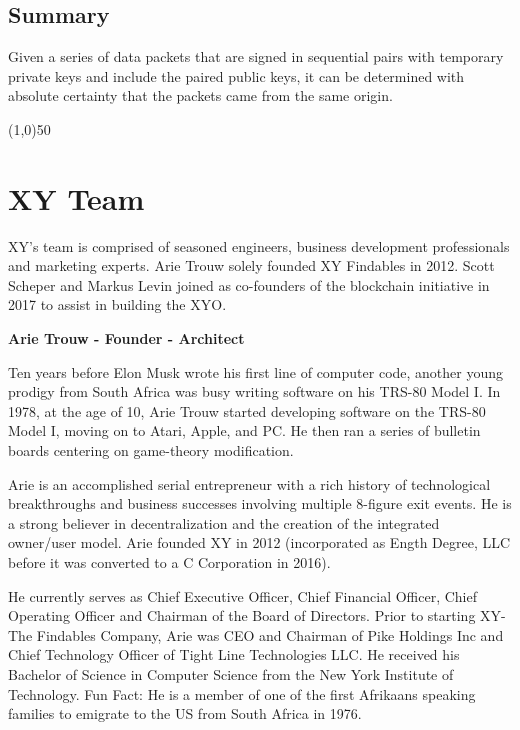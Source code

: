 \documentclass{article}
\begin{document}
\subsection {Summary}
Given a series of data packets that are signed in sequential pairs with temporary private keys and include the paired public keys, it can be determined with absolute \gls{certainty} that the packets came from the same origin.

\begin{center}
\line(1,0){50}
\end{center}
\clearpage

\section {XY Team}
XY's team is comprised of seasoned engineers, business development professionals and marketing experts. Arie Trouw solely founded XY Findables in 2012. Scott Scheper and Markus Levin joined as co-founders of the blockchain initiative in 2017 to assist in building the \Gls{XYO}.

\begin {framed}
\begin {center}
\textbf{Arie Trouw - Founder - Architect}\par
\end {center}
Ten years before Elon Musk wrote his first line of computer code, another young prodigy from South Africa was busy writing software on his TRS-80 Model I. In 1978, at the age of 10, Arie Trouw started developing software on the TRS-80 Model I, moving on to Atari, Apple, and PC. He then ran a series of bulletin boards centering on game-theory modification.

Arie is an accomplished serial entrepreneur with a rich history of technological breakthroughs and business successes involving multiple 8-figure exit events. He is a strong believer in decentralization and the creation of the integrated owner/user model. Arie founded XY in 2012 (incorporated as Ength Degree, LLC before it was converted to a C Corporation in 2016).

He currently serves as Chief Executive Officer, Chief Financial Officer, Chief Operating Officer and Chairman of the Board of Directors. Prior to starting XY-The Findables Company, Arie was CEO and Chairman of Pike Holdings Inc and Chief Technology Officer of Tight Line Technologies LLC. He received his Bachelor of Science in Computer Science from the New York Institute of Technology. Fun Fact: He is a member of one of the first Afrikaans speaking families to emigrate to the US from South Africa in 1976.

\end {framed}
\end{document}
